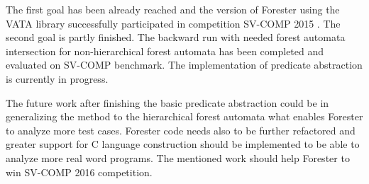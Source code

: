 \documentclass[fleqn,11pt]{ExcelAtFIT} %
\begin{document}
The first goal has been already reached and the version of Forester using the VATA library successfully participated in competition SV-COMP 2015 \cite{www:svcomp}.
The second goal is partly finished.
The backward run with needed forest automata intersection for non-hierarchical forest automata has been completed and evaluated on SV-COMP benchmark.
The implementation of predicate abstraction is currently in progress.

The future work after finishing the basic predicate abstraction could be in generalizing the method to the hierarchical forest automata
what enables Forester to analyze more test cases.
Forester code needs also to be further refactored and greater support for C language construction should be implemented to be
able to analyze more real word programs.
The mentioned work should help Forester to win SV-COMP 2016 competition.






\end{document}
